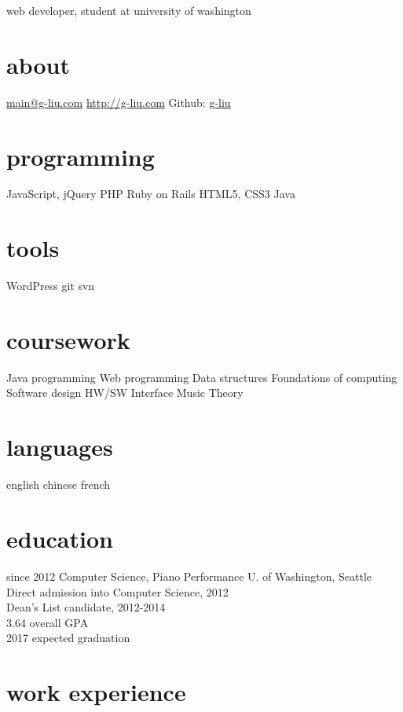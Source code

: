 \documentclass[]{friggeri-cv}
\begin{document}
       {web developer, student at university of washington}

\begin{aside}
  \section{about}
    \href{mailto:main@g-liu.com}{main@g-liu.com}
    \href{http://g-liu.com}{http://g-liu.com}
    Github: \href{http://github.com/g-liu}{g-liu}
  \section{programming}
  	JavaScript, jQuery
  	PHP
  	Ruby on Rails
    HTML5, CSS3
    Java
  \section{tools}
    WordPress
    git
    svn
  \section{coursework}
    Java programming
    Web programming
    Data structures
    Foundations of computing
    Software design
    HW/SW Interface
    Music Theory
  \section{languages}
    english
    chinese
    french
\end{aside}

\section{education}

\begin{entrylist}
  \entry
    {since 2012}
    {Computer Science, Piano Performance}
    {U. of Washington, Seattle}
    {Direct admission into Computer Science, 2012 \\
    Dean's List candidate, 2012-2014 \\
    3.64 overall GPA \\
    2017 expected graduation}
\end{entrylist}

\section{work experience}
\end{document}
